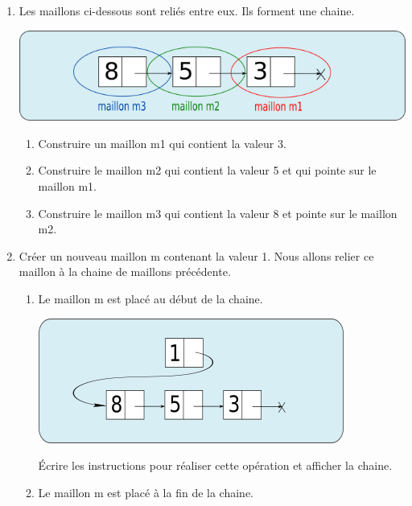 \documentclass[11pt,a4paper]{article}
\begin{document}
\begin{enumerate}
\item Les maillons ci-dessous sont reliés entre eux. Ils forment une chaine.

\begin{center}
\includegraphics[scale=0.8]{../img/maillon_chaine.png}
\end{center}

\begin{enumerate}
\setlength{\itemsep}{6pt}
\item Construire un maillon \textsf{m1} qui contient la valeur 3.
\item Construire le maillon \textsf{m2} qui contient la valeur 5 et qui pointe sur le maillon \textsf{m1}.
\item Construire le maillon \textsf{m3} qui contient la valeur 8 et pointe sur le maillon \textsf{m2}.
\end{enumerate}

\item Créer un nouveau maillon \textsf{m} contenant la valeur 1. Nous allons relier ce maillon à la chaine de maillons précédente.

\begin{enumerate}
\item Le maillon \textsf{m} est placé au début de la chaine.

\begin{center}
\includegraphics[scale=0.8]{../img/maillon_chaine_1.png}
\end{center}

Écrire les instructions pour réaliser cette opération et afficher la chaine.


\item Le maillon \textsf{m} est placé à la fin de la chaine.


\end{enumerate}
\end{enumerate}
\end{document}
